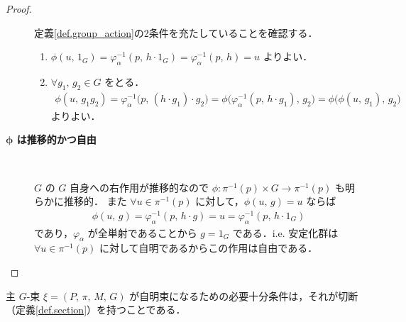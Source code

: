 \documentclass[geometry_main]{subfiles}
\begin{document}
\begin{proof}
\begin{description}
			定義\ref{def.group_action}の2条件を充たしていることを確認する．
			\begin{enumerate}
				\item $\phi(u,\, 1_G) = \varphi_\alpha^{-1}(p,\, h \cdot 1_G) = \varphi_\alpha^{-1}(p,\, h) = u$ よりよい．
				\item $\forall g_1,\, g_2 \in G$ をとる．
				\begin{align}
					\phi(u,\, g_1g_2) = \varphi_\alpha^{-1}\bigl(p,\, (h \cdot g_1) \cdot g_2 \bigr) = \phi\bigl(\varphi_\alpha^{-1}(p,\, h \cdot g_1),\, g_2\bigr) = \phi \bigl( \phi(u,\, g_1),\, g_2 \bigr) 
				\end{align} 
				よりよい．
			\end{enumerate}
		\item[\textbf{$\bm{\phi}$ は推移的かつ自由}]　
		
			$G$ の $G$ 自身への右作用が推移的なので $\phi \colon \pi^{-1}(p) \times G \to \pi^{-1}(p)$ も明らかに推移的．
			また $\forall u \in \pi^{-1}(p)$ に対して，$\phi(u,\, g) = u$ ならば
			\begin{align}
				\phi(u,\, g) = \varphi_\alpha^{-1}(p,\, h \cdot g) = u = \varphi_\alpha^{-1}(p,\, h \cdot 1_G)
			\end{align}
			であり，$\varphi_\alpha$ が全単射であることから $g = 1_G$ である．i.e. 安定化群は $\forall u \in \pi^{-1}(p)$ に対して自明であるからこの作用は自由である．
	\end{description}
\end{proof}

\begin{myprop}[]{}
	主 $G$-束 $\xi = (P,\, \pi,\, M,\, G)$ が自明束になるための必要十分条件は，それが切断（定義\ref{def.section}）を持つことである．
\end{myprop}
\end{document}
